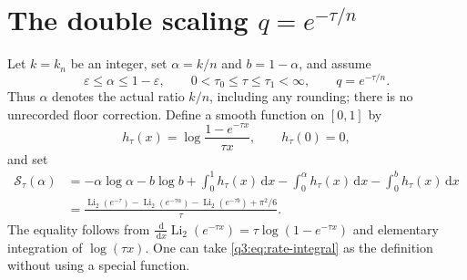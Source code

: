\documentclass[11pt,a4paper,oneside,openany]{book}
\theoremstyle{definition}
\theoremstyle{remark}
\DeclareMathOperator{\Li}{Li}
\newcommand{\dd}{\,\mathrm d}
\begin{document}
\section{The double scaling \texorpdfstring{$q=e^{-\tau/n}$}{q = exp(-tau/n)}}
Let $k=k_n$ be an integer, set $\alpha=k/n$ and $b=1-\alpha$, and
assume
\begin{equation}
 \varepsilon\le\alpha\le1-\varepsilon,\qquad
 0<\tau_0\le\tau\le\tau_1<\infty,
 \qquad q=e^{-\tau/n}.
 \label{q3:eq:double-scaling-domain}
\end{equation}
Thus $\alpha$ denotes the actual ratio $k/n$, including any rounding;
there is no unrecorded floor correction. Define a smooth function on
$[0,1]$ by
\begin{equation}
 h_\tau(x)=\log\frac{1-e^{-\tau x}}{\tau x},\qquad h_\tau(0)=0,
 \label{q3:eq:h-tau}
\end{equation}
and set
\begin{align}
 \mathscr S_\tau(\alpha)
 &=-\alpha\log\alpha-b\log b
      +\int_0^1h_\tau(x)\dd x
      -\int_0^\alpha h_\tau(x)\dd x
      -\int_0^b h_\tau(x)\dd x
 \label{q3:eq:rate-integral}\\
 &=\frac{\Li_2(e^{-\tau})-\Li_2(e^{-\tau\alpha})
                  -\Li_2(e^{-\tau b})+\pi^2/6}{\tau}.
 \label{q3:eq:rate-dilog}
\end{align}
The equality follows from
$\frac{\dd}{\dd x}\Li_2(e^{-\tau x})
=\tau\log(1-e^{-\tau x})$ and elementary integration of
$\log(\tau x)$. One can take \cref{q3:eq:rate-integral} as the definition
without using a special function.
\end{document}

